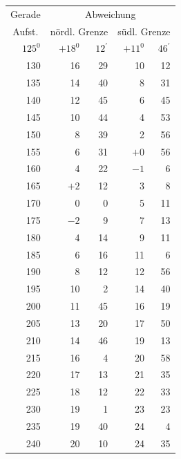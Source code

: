 \begin{center}
\begin{tabular}{|r|r@{\;}r|r@{\;}r|}
\multicolumn{1}{|c|}{Gerade}&\multicolumn{4}{c|}{Abweichung}\\
\multicolumn{1}{|c|}{Aufst.}&\multicolumn{2}{c|}{nördl. Grenze}&\multicolumn{2}{c|}{südl. Grenze}\\
\(125^{0}\)&\(+18^{0}\)&\(12^{\prime}\)&\(+11^{0}\)&\(46^{\prime}\)\\
130&16&29&10&12\\
135&14&40&8&31\\
140&12&45&6&45\\
145&10&44&4&53\\
150&8&39&2&56\\
155&6&31&\(+0\)&56\\
160&4&22&\(-1\)&6\\
165&\(+2\)&12&3&8\\
170&0&0&5&11\\
175&\(-2\)&9&7&13\\
180&4&14&9&11\\
185&6&16&11&6\\
190&8&12&12&56\\
195&10&2&14&40\\
200&11&45&16&19\\
205&13&20&17&50\\
210&14&46&19&13\\
215&16&4&20&58\\
220&17&13&21&35\\
225&18&12&22&33\\
230&19&1&23&23\\
235&19&40&24&4\\
240&20&10&24&35\\\hline
\end{tabular}
\end{center}
